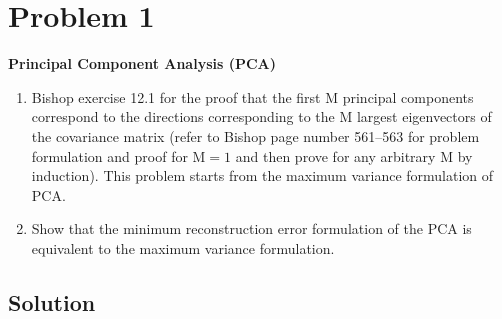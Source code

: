 \section*{Problem 1}

\textbf{Principal Component Analysis (PCA)}

\begin{enumerate}[label= (\alph*), noitemsep, topsep=0pt]
    \item Bishop exercise 12.1 for the proof that the first M principal components correspond to the directions corresponding to the M largest eigenvectors of the covariance matrix (refer to Bishop page number 561--563 for problem formulation and proof for \( \mathrm{M}=1 \) and then prove for any arbitrary M by induction).
          This problem starts from the maximum variance formulation of PCA.\@

    \item Show that the minimum reconstruction error formulation of the PCA is equivalent to the maximum variance formulation.
\end{enumerate}

\subsection*{Solution}
